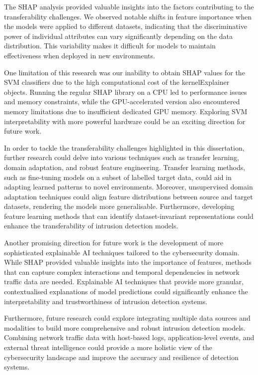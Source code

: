 The SHAP analysis provided valuable insights into the factors contributing to the transferability challenges. We observed notable shifts in feature importance when the models were applied to different datasets, indicating that the discriminative power of individual attributes can vary significantly depending on the data distribution. This variability makes it difficult for models to maintain effectiveness when deployed in new environments.

One limitation of this research was our inability to obtain SHAP values for the SVM classifiers due to the high computational cost of the kernelExplainer objects. Running the regular SHAP library on a CPU led to performance issues and memory constraints, while the GPU-accelerated version also encountered memory limitations due to insufficient dedicated GPU memory. Exploring SVM interpretability with more powerful hardware could be an exciting direction for future work.

In order to tackle the transferability challenges highlighted in this dissertation, further research could delve into various techniques such as transfer learning, domain adaptation, and robust feature engineering. Transfer learning methods, such as fine-tuning models on a subset of labelled target data, could aid in adapting learned patterns to novel environments. Moreover, unsupervised domain adaptation techniques could align feature distributions between source and target datasets, rendering the models more generalisable. Furthermore, developing feature learning methods that can identify dataset-invariant representations could enhance the transferability of intrusion detection models.

Another promising direction for future work is the development of more sophisticated explainable AI techniques tailored to the cybersecurity domain. While SHAP provided valuable insights into the importance of features, methods that can capture complex interactions and temporal dependencies in network traffic data are needed. Explainable AI techniques that provide more granular, contextualised explanations of model predictions could significantly enhance the interpretability and trustworthiness of intrusion detection systems.

Furthermore, future research could explore integrating multiple data sources and modalities to build more comprehensive and robust intrusion detection models. Combining network traffic data with host-based logs, application-level events, and external threat intelligence could provide a more holistic view of the cybersecurity landscape and improve the accuracy and resilience of detection systems.

